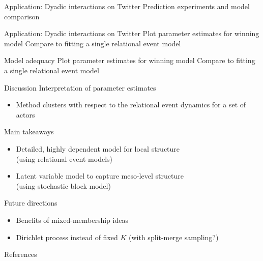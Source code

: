 \documentclass{beamer}
\begin{document}
\begin{frame}{Application: Dyadic interactions on Twitter}
Prediction experiments and model comparison
\end{frame}

\begin{frame}{Application: Dyadic interactions on Twitter}
Plot parameter estimates for winning model
Compare to fitting a single relational event model
\end{frame}

\begin{frame}{Model adequacy}
Plot parameter estimates for winning model
Compare to fitting a single relational event model
\end{frame}

\begin{frame}{Discussion}
Interpretation of parameter estimates
  \begin{itemize}
  \item Method clusters with respect to the relational event dynamics for a set of actors
  \end{itemize}

Main takeaways
\begin{itemize}
\item Detailed, highly dependent model for local structure\\ (using relational event models)
\item Latent variable model to capture meso-level structure \\(using stochastic block model)
\end{itemize}
\end{frame}

\begin{frame}{Future directions}
  \begin{itemize}
  \item Benefits of mixed-membership ideas
  \item Dirichlet process instead of fixed $K$ (with split-merge sampling?)
  \end{itemize}
\end{frame}

\begin{frame}{References}
  
\end{frame}
\end{document}
